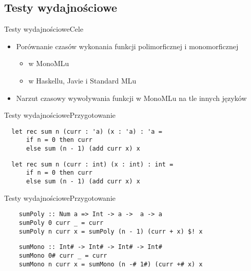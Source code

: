 \documentclass{beamer}
\begin{document}
\subsection{Testy wydajnościowe}

\begin{frame}[fragile]{Testy wydajnościowe}{Cele}
    \begin{itemize}
    \item Porównanie czasów wykonania funkcji polimorficznej i monomorficznej
    \pause 
    \begin{itemize}
        \item w MonoMLu
        \pause
        \item w Haskellu, Javie i Standard MLu
    \pause
    \end{itemize}
    \item Narzut czasowy wywoływania funkcji w MonoMLu na tle innych języków
    \end{itemize}
\end{frame}

\begin{frame}[fragile]{Testy wydajnościowe}{Przygotowanie}
 \begin{center}
\begin{minipage}{1.0\textwidth}
\begin{verbatim}
  let rec sum n (curr : 'a) (x : 'a) : 'a = 
      if n = 0 then curr 
      else sum (n - 1) (add curr x) x 
\end{verbatim}
\pause
\pagebreak
\pagebreak
\begin{verbatim}
  let rec sum n (curr : int) (x : int) : int = 
      if n = 0 then curr 
      else sum (n - 1) (add curr x) x 
\end{verbatim}
\end{minipage}
\end{center}
\end{frame}

\begin{frame}[fragile]{Testy wydajnościowe}{Przygotowanie}
 \begin{center}
\begin{minipage}{1.0\textwidth}
\begin{verbatim}
    sumPoly :: Num a => Int -> a ->  a -> a
    sumPoly 0 curr _ = curr 
    sumPoly n curr x = sumPoly (n - 1) (curr + x) $! x
\end{verbatim}
\pagebreak
\pagebreak
\begin{verbatim}
    sumMono :: Int# -> Int# -> Int# -> Int# 
    sumMono 0# curr _ = curr 
    sumMono n curr x = sumMono (n -# 1#) (curr +# x) x
\end{verbatim}
\end{minipage}
\end{center}
\end{frame}
\end{document}
